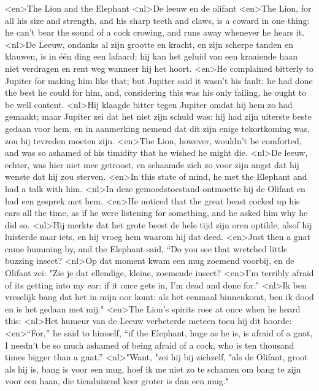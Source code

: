 <en>The Lion and the  Elephant
<nl>De leeuw en de olifant
<en>The Lion, for all his size and strength, and his sharp teeth and claws, is a coward in one thing: he can’t bear the sound of a cock crowing, and runs away whenever he hears it.
<nl>De Leeuw, ondanks al zijn grootte en kracht, en zijn scherpe tanden en klauwen, is in één ding een lafaard: hij kan het geluid van een kraaiende haan niet verdragen en rent weg wanneer hij het hoort.
<en>He complained bitterly to Jupiter for making him like that; but Jupiter said it wasn’t his fault: he had done the best he could for him, and, considering this was his only failing, he ought to be well content.
<nl>Hij klaagde bitter tegen Jupiter omdat hij hem zo had gemaakt; maar Jupiter zei dat het niet zijn schuld was: hij had zijn uiterste  beste gedaan voor hem, en in aanmerking nemend dat dit zijn enige tekortkoming was, zou hij tevreden moeten zijn.
<en>The Lion, however, wouldn’t be comforted, and was so ashamed of his timidity that he wished he might die.
<nl>De leeuw, echter, was hier niet mee getroost, en schaamde zich zo voor zijn angst dat hij wenste dat hij zou sterven.
<en>In this state of mind, he met the Elephant and had a talk with him.
<nl>In deze gemoedstoestand ontmoette hij de Olifant en had een gesprek met hem.
<en>He noticed that the great beast cocked up his ears all the time, as if he were listening for something, and he asked him why he did so.
<nl>Hij merkte dat het grote beest de hele tijd zijn oren optilde, alsof hij luisterde naar iets, en hij vroeg hem waarom hij dat deed.
<en>Just then a gnat came humming by, and the Elephant said, “Do you see that wretched little buzzing insect?
<nl>Op dat moment kwam een mug zoemend voorbij, en de Olifant zei: "Zie je dat ellendige, kleine, zoemende insect?
<en>I’m terribly afraid of its getting into my ear: if it once gets in, I’m dead and done for.” 
<nl>Ik ben vreselijk bang dat het in mijn oor komt: als het eenmaal binnenkomt, ben ik dood en is het gedaan met mij."
<en>The Lion’s spirits rose at once when he heard this: 
<nl>Het humeur van de Leeuw verbeterde meteen toen hij dit hoorde: 
<en>“For,” he said to himself, “if the Elephant, huge as he is, is afraid of a gnat, I needn’t be so much ashamed of being afraid of a cock, who is ten thousand times bigger than a gnat.”
<nl>"Want, "zei hij bij zichzelf, "als de Olifant, groot als hij is, bang is voor een mug, hoef ik me niet zo te schamen om bang te zijn voor een haan, die tienduizend keer groter is dan een mug."
